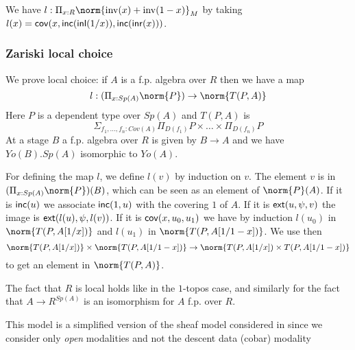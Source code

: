 We have $l:\Pi_{x:R}\norm{\inv(x)+\inv(1-x)}_M$ by taking $l(x) = \mathsf{cov}(x,\mathsf{inc}(\mathsf{inl}(1/x)),\mathsf{inc}(\mathsf{inr}(x)))$.

\subsubsection{Zariski local choice}

We prove local choice: if $A$ is a f.p. algebra over $R$ then we have a map
$$
l:(\Pi_{x:Sp(A)}\norm{P})\rightarrow \norm{T(P,A)}
$$
Here $P$ is a dependent type over $Sp(A)$ and $T(P,A)$ is
$$\Sigma_{f_1,\dots,f_n:Cov(A)}\Pi_{D(f_1)}P\times\dots\times\Pi_{D(f_n)}P$$
At a stage $B$ a f.p. algebra over $R$ is given by $B\rightarrow A$ and we have $Yo(B).Sp(A)$ isomorphic
to $Yo(A)$.

For defining the map $l$, we define $l(v)$ by induction on $v$.
The element $v$ is in $(\Pi_{x:Sp(A)}\norm{P})(B)$, which can be seen as
an element of $\norm{P}(A)$. If it is $\mathsf{inc}(u)$ we associate $\mathsf{inc}(1,u)$ with the covering $1$ of $A$.
If it is $\mathsf{ext}(u,\psi,v)$ the image is $\mathsf{ext}(l(u),\psi,l(v))$.
If it is $\mathsf{cov}(x,u_0,u_1)$ we have by induction $l(u_0)$ in $\norm{T(P,A[1/x])}$ and
  $l(u_1)$ in $\norm{T(P,A[1/1-x])}$. We use then 
  $$
\norm{T(P,A[1/x])}\times\norm{T(P,A[1/1-x])}\rightarrow \norm{T(P,A[1/x])\times T(P,A[1/1-x])}
  $$
to get an element in $\norm{T(P,A)}$.

\medskip

The fact that $R$ is local holds like in the $1$-topos case, and similarly for the fact that
$A\rightarrow R^{Sp(A)}$ is an isomorphism for $A$ f.p. over $R$.

\medskip

This model is a simplified version of the sheaf model considered in \cite{CRS21} since we consider only
{\em open} modalities and not the descent data (cobar) modality





     
                                                                                  




 
